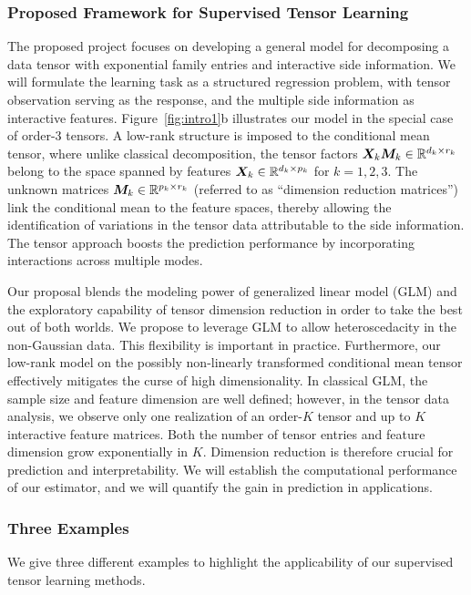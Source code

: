 \documentclass[10pt]{article}
\theoremstyle{definition}
\theoremstyle{definition}
\theoremstyle{definition}
\begin{document}
\begin{enumerate}
\subsubsection{Proposed Framework for Supervised Tensor Learning} 
The proposed project focuses on developing a general model for decomposing a data tensor with exponential family entries and interactive side information. We will formulate the learning task as a structured regression problem, with tensor observation serving as the response, and the multiple side information as interactive features. Figure~\ref{fig:intro1}b illustrates our model in the special case of order-3 tensors. A low-rank structure is imposed to the conditional mean tensor, where unlike classical decomposition, the tensor factors $\bm X_k\bm M_k\in\mathbb{R}^{d_k\times r_k}$ belong to the space spanned by features $\bm X_k\in\mathbb{R}^{d_k\times p_k}$ for $k=1,2,3$. The unknown matrices $\bm M_k\in\mathbb{R}^{p_k\times r_k}$ (referred to as ``dimension reduction matrices'') link the conditional mean to the feature spaces, thereby allowing the identification of variations in the tensor data attributable to the side information. The tensor approach boosts the prediction performance by incorporating interactions across multiple modes. 


Our proposal blends the modeling power of generalized linear model (GLM) and the exploratory capability of tensor dimension reduction in order to take the best out of both worlds. We propose to leverage GLM to allow heteroscedacity in the non-Gaussian data. This flexibility is important in practice. Furthermore, our low-rank model on the possibly non-linearly transformed conditional mean tensor effectively mitigates the curse of high dimensionality. In classical GLM, the sample size and feature dimension are well defined; however, in the tensor data analysis, we observe only one realization of an order-$K$ tensor and up to $K$ interactive feature matrices. Both the number of tensor entries and feature dimension grow exponentially in $K$. Dimension reduction is therefore crucial for prediction and interpretability. We will establish the computational performance of our estimator, and we will quantify the gain in prediction in applications. 

\subsubsection{Three Examples}
We give three different examples to highlight the applicability of our supervised tensor learning methods.\\


\end{enumerate}
\end{document}
